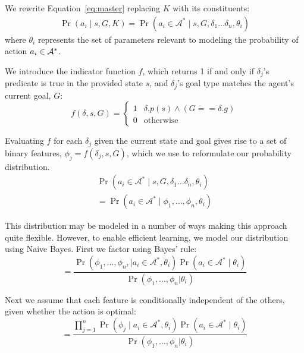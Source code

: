 \documentclass[letterpaper]{article}
\begin{document}
We rewrite Equation~\ref{eq:master} replacing $K$ with its constituents:
\begin{multline}
\Pr(a_i \mid s, G, K)
= \Pr(a_i \in \mathcal{A}^* \mid s, G, \delta_1 \ldots \delta_n, \theta_i)
\end{multline}
\noindent where $\theta_i$ represents the set of parameters relevant to modeling
the probability of action $a_i \in {\cal A}^*$. 

We introduce the indicator function $f$, which returns 1 if and only if $\delta_j$'s predicate is true in the provided state $s$, and $\delta_j$'s goal type matches the agent's current goal, $G$:
\begin{equation}
f(\delta, s, G) = 
\begin{cases}
1& \delta.p(s) \wedge (G == \delta.g) \\
0& \text{otherwise}
\end{cases}
\label{eq:f_func_def}
\end{equation}

Evaluating $f$ for each $\delta_j$ given the current state and goal gives rise to a set of binary features,
$\phi_j = f(\delta_j, s, G)$, which we use to reformulate our probability distribution.
\begin{multline}
\Pr(a_i \in \mathcal{A}^*  \mid s, G, \delta_1 \ldots \delta_n, \theta_i) \\
= \Pr(a_i \in \mathcal{A}^*  \mid \phi_1, \ldots, \phi_n, \theta_i)
\label{eq:feature_rep}
\end{multline}

This distribution may be modeled in a number of ways making this
approach quite flexible. However, to enable efficient learning, we model our distribution using Naive
Bayes. First we factor using Bayes' rule:
\begin{equation}
= \frac{\Pr(\phi_1, \ldots, \phi_{n}, \mid a_i \in \mathcal{A}^*, \theta_i) \Pr(a_i \in \mathcal{A}^* \mid \theta_i)}{\Pr(\phi_1, \ldots, \phi_{n} | \theta_i)}
\label{eq:bayes}
\end{equation}

Next we assume that each feature is conditionally independent of the others, given whether the action is optimal:
\begin{equation}
= \frac{\prod_{j=1}^{n} \Pr(\phi_j \mid a_i \in \mathcal{A}^*, \theta_i) \Pr(a_i \in \mathcal{A}^* \mid \theta_i) }{\Pr(\phi_1, \ldots, \phi_{n} | \theta_i)}
\label{eq:final}
\end{equation}
\end{document}
